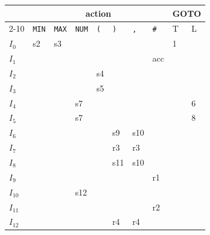 \documentclass[dvipdfmx]{jarticle}
\begin{document}
\begin{tabularx}{.8\textwidth}{|X||X|X|X|X|X|X|X||X|X|}\hline
           & \multicolumn{7}{c||}{action} & \multicolumn{2}{c|}{GOTO}                                                                             \\\cline{2-10}
           & \texttt{MIN}                 & \texttt{MAX}              & \texttt{NUM} & \texttt{(} & \texttt{)} & \texttt{,} & \texttt{\#} & T & L \\\hline\hline
  $I_0$    & s2                           & s3                        &              &            &            &            &             & 1 &   \\\hline
  $I_1$    &                              &                           &              &            &            &            & acc         &   &   \\\hline
  $I_2$    &                              &                           &              & s4         &            &            &             &   &   \\\hline
  $I_3$    &                              &                           &              & s5         &            &            &             &   &   \\\hline
  $I_4$    &                              &                           & s7           &            &            &            &             &   & 6 \\\hline
  $I_5$    &                              &                           & s7           &            &            &            &             &   & 8 \\\hline
  $I_6$    &                              &                           &              &            & s9         & s10        &             &   &   \\\hline
  $I_7$    &                              &                           &              &            & r3         & r3         &             &   &   \\\hline
  $I_8$    &                              &                           &              &            & s11        & s10        &             &   &   \\\hline
  $I_9$    &                              &                           &              &            &            &            & r1          &   &   \\\hline
  $I_{10}$ &                              &                           & s12          &            &            &            &             &   &   \\\hline
  $I_{11}$ &                              &                           &              &            &            &            & r2          &   &   \\\hline
  $I_{12}$ &                              &                           &              &            & r4         & r4         &             &   &   \\\hline
\end{tabularx}
\end{document}
